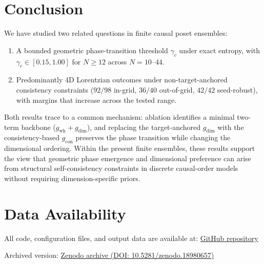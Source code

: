 \documentclass[12pt,a4paper]{article}
\newif\ifdoubleblind
\begin{document}
\section{Conclusion}
\label{sec:conclusion}

We have studied two related questions in finite causal poset ensembles:

\begin{enumerate}[nosep]
\item A bounded geometric phase-transition threshold $\gamma_c$ under exact
entropy, with $\gamma_c \in [0.15, 1.00]$ for $N \geq 12$ across
$N = 10$--$44$.
\item Predominantly 4D Lorentzian outcomes under non-target-anchored consistency
constraints ($92/98$ in-grid, $36/40$ out-of-grid, $42/42$ seed-robust),
with margins that increase across the tested range.
\end{enumerate}

Both results trace to a common mechanism: ablation identifies a minimal
two-term backbone ($g_{\text{wh}} + g_{\text{dim}}$), and replacing the
target-anchored $g_{\text{dim}}$ with the consistency-based $g_{\text{con}}$
preserves the phase transition while changing the dimensional ordering. Within
the present finite ensembles, these results support the view that geometric
phase emergence and dimensional preference can arise from structural
self-consistency constraints in discrete causal-order models without requiring
dimension-specific priors.

\ifdoubleblind
\section*{Data Availability}

Code, configuration files, and output tables used in this study are archived
and will be provided to the editors and reviewers in anonymized form upon
request during peer review.

\else
\section*{Data Availability}

All code, configuration files, and output data are available at:
\href{https://github.com/unicome37/poset_phase}{GitHub repository}

Archived version:
\href{https://doi.org/10.5281/zenodo.18980657}{Zenodo archive (DOI: 10.5281/zenodo.18980657)}
\fi
\end{document}
